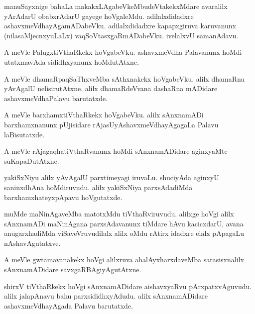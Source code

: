 \documentclass{article}
\begin{document}
\begin{mn}
manuSayxnige bahaLa makakxLAgabeVkeMbudeVtakekxMdare avaralilx yArAdarU obabxrAdarU gayege 
hoVgaleMdu. adilalxdidadxre ashavxmeVdhayAgamADabeVku. adilalxdidadxre kapapxgiruva karuvanunx 
(nilasaMjecnxyuLaLx) vaqSoVtasxgaRmADabeVku. ivelalxvU samanAdavu.
\end{mn}

\begin{mn}
A meVle PalugxtiVthaRkekx hoVgabeVku. ashavxmeVdha Palavanunx  hoMdi utatxmavAda sididhxyanunx 
hoMdutAtxne.
\end{mn}

\begin{mn}
A meVle dhamaRpaqSaThxveMba sAthxnakekx hoVgabeVku. alilx dhamaRnu yAvAgalU nelisirutAtxne. alilx 
dhamaRdeVvana dashaRna mADidare ashavxmeVdhaPalavu barutatxde.
\end{mn}

\begin{mn}
A meVle barxhamxtiVthaRkekx hoVgabeVku. alilx sAnxnamADi barxhamxnanunx pUjisidare 
rAjasUyAshavxmeVdhayAgagaLa Palavu laBisutatxde.
\end{mn}

\begin{mn}
A meVle rAjagaqhatiVthaRvanunx hoMdi sAnxnamADidare aginxyaMte suKapaDutAtxne.
\end{mn}

\begin{mn}
yakiSxNiyu alilx yAvAgalU parxtimeyagi iruvaLu. shuciyAda aginxyU saninxdhAna hoMdiruvudu. alilx 
yakiSxNiya parxsAdadiMda barxhamxhateyxpApavu hoVgutatxde.
\end{mn}

\begin{mn}
muMde maNinAgaveMba matotxMdu tiVthaRviruvudu. alilxge hoVgi alilx sAnxnamADi maNinAgana 
parxsAdavanunx tiMdare hAvu kacicxdarU, avana anugarxhadiMda viSaveVruvudilalx alilx oMdu rAtirx 
idadxre elalx pApagaLu nAshavAgutatxve.
\end{mn}

\begin{mn}
A meVle gwtamavanakekx hoVgi alilxruva ahalAyxharxdaveMba sarasisxnalilx sAnxnamADidare 
savxgaRBAgiyAgutAtxne.
\end{mn}

\begin{mn}
shirxV tiVthaRkekx hoVgi sAnxnamADidare aishavxyaRvu pArxpatxvAguvudu. alilx jalapAnavu bahu 
parxsididhxyAdudu. alilx sAnxnamADidare ashavxmeVdhayAgada Palavu barutatxde.
\end{mn}
\end{document}
